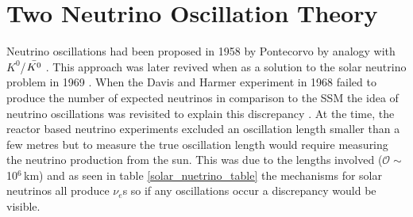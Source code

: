 \section{Two Neutrino Oscillation Theory} \label{section_neutrino_oscillations}
Neutrino oscillations had been proposed in 1958 by Pontecorvo by analogy with $K^0$/$\Bar{K^0}$   \cite{griffiths2008neutrinoOscillations} \cite{pontecorvo1958_OscillationProposal}. This approach was later revived when as a solution to the solar neutrino problem in 1969 \cite{pontecorvo_gibov_1969_solar_oscillation}. When the Davis and Harmer experiment in 1968 failed to produce the number of expected neutrinos in comparison to the SSM the idea of neutrino oscillations was revisited to explain this discrepancy \cite{pontecorvo_gibov_1969_solar_oscillation}. At the time, the reactor based neutrino experiments excluded an oscillation length smaller than a few metres but to measure the true oscillation length would require measuring the neutrino production from the sun. This was due to the lengths involved ($\mathcal{O} \sim$ 10$^6$\,km) \cite{pontecorvo_gibov_1969_solar_oscillation} and as seen in table \ref{solar_nuetrino_table} the mechanisms for solar neutrinos all produce $\nu_e$s so if any oscillations occur a discrepancy would be visible. 

